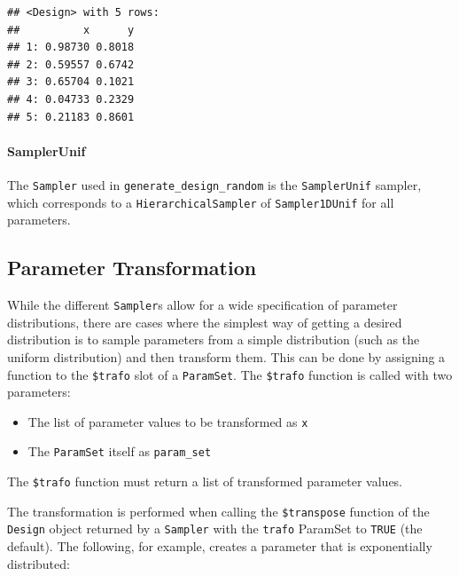 \documentclass[
]{scrbook}
\providecommand{\tightlist}{%
  \setlength{\itemsep}{0pt}\setlength{\parskip}{0pt}}
\begin{document}
\begin{verbatim}
## <Design> with 5 rows:
##          x      y
## 1: 0.98730 0.8018
## 2: 0.59557 0.6742
## 3: 0.65704 0.1021
## 4: 0.04733 0.2329
## 5: 0.21183 0.8601
\end{verbatim}

\hypertarget{samplerunif}{%
\paragraph{SamplerUnif}\label{samplerunif}}

The \texttt{Sampler} used in \texttt{generate\_design\_random} is the \texttt{SamplerUnif} sampler, which corresponds to a \texttt{HierarchicalSampler} of \texttt{Sampler1DUnif} for all parameters.

\hypertarget{parameter-transformation}{%
\subsection{Parameter Transformation}\label{parameter-transformation}}

While the different \texttt{Sampler}s allow for a wide specification of parameter distributions, there are cases where the simplest way of getting a desired distribution is to sample parameters from a simple distribution (such as the uniform distribution) and then transform them.
This can be done by assigning a function to the \texttt{\$trafo} slot of a \texttt{ParamSet}.
The \texttt{\$trafo} function is called with two parameters:

\begin{itemize}
\tightlist
\item
  The list of parameter values to be transformed as \texttt{x}
\item
  The \texttt{ParamSet} itself as \texttt{param\_set}
\end{itemize}

The \texttt{\$trafo} function must return a list of transformed parameter values.

The transformation is performed when calling the \texttt{\$transpose} function of the \texttt{Design} object returned by a \texttt{Sampler} with the \texttt{trafo} ParamSet to \texttt{TRUE} (the default).
The following, for example, creates a parameter that is exponentially distributed:
\end{document}
